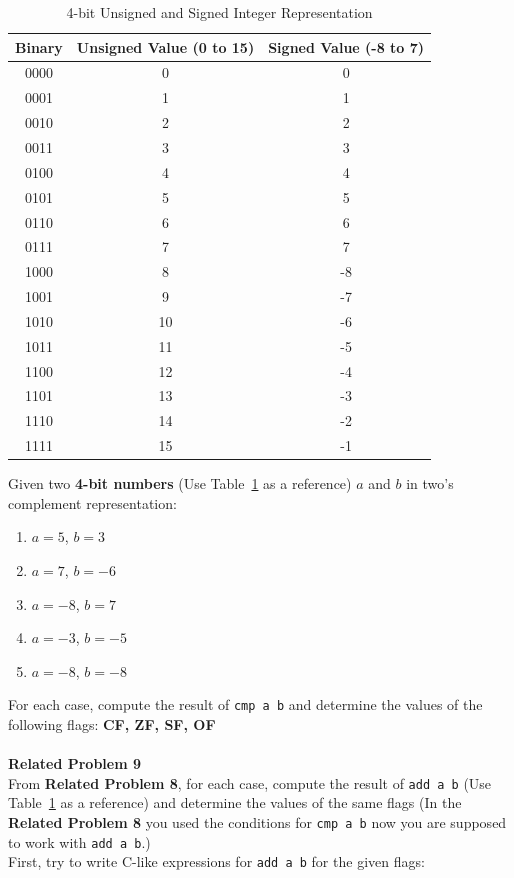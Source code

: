 \documentclass{article}
\begin{document}
\begin{table}[h]
    \centering
    \renewcommand{\arraystretch}{1.2}
    \begin{tabular}{|c|c|c|}
        \hline
        \textbf{Binary} & \textbf{Unsigned Value (0 to 15)} & \textbf{Signed Value (-8 to 7)} \\
        \hline
        0000 & 0  & 0  \\
        0001 & 1  & 1  \\
        0010 & 2  & 2  \\
        0011 & 3  & 3  \\
        0100 & 4  & 4  \\
        0101 & 5  & 5  \\
        0110 & 6  & 6  \\
        0111 & 7  & 7  \\
        1000 & 8  & -8 \\
        1001 & 9  & -7 \\
        1010 & 10 & -6 \\
        1011 & 11 & -5 \\
        1100 & 12 & -4 \\
        1101 & 13 & -3 \\
        1110 & 14 & -2 \\
        1111 & 15 & -1 \\
        \hline
    \end{tabular}
    \caption{4-bit Unsigned and Signed Integer Representation}
    \label{four-bit-int}
\end{table}

 
Given two \textbf{4-bit numbers} (Use Table~\ref{four-bit-int} as a reference) $a$ and $b$ in two’s complement representation:

\begin{enumerate}
    \item $a = 5$, $b = 3$
    \item $a = 7$, $b = -6$
    \item $a = -8$, $b = 7$
    \item $a = -3$, $b = -5$
    \item $a = -8$, $b = -8$
\end{enumerate}

For each case, compute the result of \texttt{cmp a b} and determine the values of the following flags: \textbf{CF, ZF, SF, OF} \\
\\
\clearpage
\noindent\textbf{Related Problem 9}  \\
From \textbf{Related Problem 8}, for each case, compute the result of \texttt{add a b} (Use Table~\ref{four-bit-int} as a reference) and determine the values of the same flags (In the \textbf{Related Problem 8} you used the conditions for \texttt{cmp a b} now you are supposed to work with \texttt{add a b}.) \\ 
First, try to write C-like expressions for \texttt{add a b} for the given flags: \\
\end{document}
